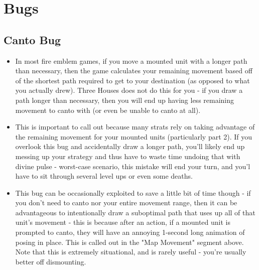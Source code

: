 \section*{Bugs}

\subsection*{Canto Bug}
\begin{itemize}
\item In most fire emblem games, if you move a mounted unit with a longer path than necessary, then the game calculates your remaining movement based off of the shortest path required to get to your destination (as opposed to what you actually drew). Three Houses does not do this for you - if you draw a path longer than necessary, then you will end up having less remaining movement to canto with (or even be unable to canto at all).
\item This is important to call out because many strats rely on taking advantage of the remaining movement for your mounted units (particularly part 2). If you overlook this bug and accidentally draw a longer path, you'll likely end up messing up your strategy and thus have to waste time undoing that with divine pulse - worst-case scenario, this mistake will end your turn, and you'l have to sit through several level ups or even some deaths.
\item This bug can be occasionally exploited to save a little bit of time though - if you don't need to canto nor your entire movement range, then it can be advantageous to intentionally draw a suboptimal path that uses up all of that unit's movement - this is because after an action, if a mounted unit is prompted to canto, they will have an annoying 1-second long animation of posing in place. This is called out in the "Map Movement" segment above. Note that this is extremely situational, and is rarely useful - you're usually better off dismounting.
\end{itemize}

